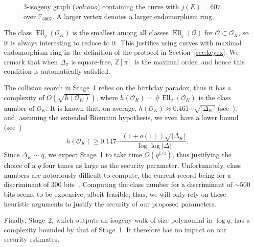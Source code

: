 \documentclass{llncs}
\newcommand{\F}{\mathbb{F}}
\renewcommand{\O}{\mathcal{O}}
\DeclareMathOperator{\Ell}{Ell}
\begin{document}
\begin{figure}
  \centering
  \caption{$3$-isogeny graph (\emph{volcano}) containing the curve
    with $j(E)=607$ over $\F_{6007}$. A larger vertex denotes a larger
    endomorphism ring.}
  \label{fig:volcano}
\end{figure}

The class $\Ell_q(\O_K)$ is the smallest among all classes
$\Ell_q(\O)$ for $\O⊂\O_K$, so it is always interesting to
reduce to it. This justifies using curves with maximal endomorphism
ring in the definition of the protocol in
Section~\ref{sec:keyex}. We remark that when $Δ_π$ is square-free, $ℤ[π]$
is the maximal order, and hence this condition is automatically satisfied.

The collision search in Stage~1 relies on the birthday paradox, thus
it has a complexity of $O(\sqrt{h(\O_K)})$, where $h(\O_K)=\#\Ell_q(\O_K)$ is the
class number of $\O_K$.  It is known that, on average,
$h(\O_K)≈0.461\cdots\sqrt{|Δ_K|}$ (see~\cite[5.10]{Cohen1993}), and,
assuming the extended Riemann hypothesis, we even have a lower bound
(see~\cite{littlewood1928class})
\[h(\O_K) ≥ 0.147\cdots\frac{(1+o(1))\sqrt{|Δ_K|}}{\log\log|Δ|}.\]
Since $Δ_K\sim q$, we expect Stage~1 to take time $O(q^{1/4})$,
thus justifying the choice of a $q$ four times as large as the
security parameter.  Unfortunately, class numbers are notoriously
difficult to compute, the current record being
for a discriminant of 300 bits~\cite{10.1007/978-3-642-14081-5_15}.
Computing the class
number for a discriminant of ${\sim 500}$ bits seems to be expensive,
albeit feasible; thus, we will only rely on these heuristic arguments
to justify the security of our proposed parameters.

Finally, Stage~2,
which outputs an isogeny walk of size polynomial in $\log q$,
has a complexity bounded by that of Stage~1.
It therefore has no impact on our security estimates.
\end{document}

